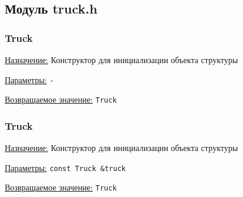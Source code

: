 \subsection{Модуль truck.h}


\subsubsection{Truck}

\underline{Назначение:} Конструктор для инициализации объекта структуры

\underline{Параметры:} \verb|-|

\underline{Возвращаемое значение:} \verb|Truck|


\subsubsection{Truck}

\underline{Назначение:} Конструктор для инициализации объекта структуры

\underline{Параметры:} \verb|const Truck &truck|

\underline{Возвращаемое значение:} \verb|Truck|

